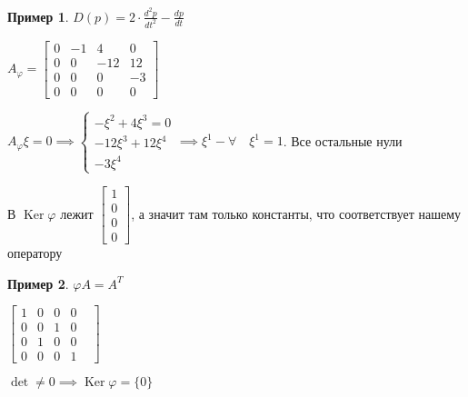 \documentclass{book}
\DeclareMathOperator{\Ker}{Ker}
\theoremstyle{definition}
\newtheorem*{example}{Пример}
\begin{document}
\begin{example}
    $D(p) = 2\cdot \frac{d^2p}{dt^2} - \frac{dp}{dt}$ 

    $A_{\varphi} = \begin{bmatrix} 0&-1&4&0\\0&0&-12&12\\0&0&0&-3\\0&0&0&0 \end{bmatrix} $

    $A_{\varphi}\xi = 0 \implies \begin{cases}
        -\xi^2 + 4\xi^3 = 0\\
        -12\xi^3 + 12\xi^4\\
        -3\xi^4
    \end{cases} \implies \xi^1 - \forall \quad \xi^1 = 1$. Все остальные нули

    В $\Ker\varphi$ лежит  $\begin{bmatrix} 1\\0\\0\\0 \end{bmatrix} $, а значит там только константы, что соответствует нашему оператору
\end{example}

\begin{example}
    $\varphi A = A^T$

    $\begin{bmatrix} 1&0&0&0\\0&0&1&0\\0&1&0&0&\\0&0&0&1 \end{bmatrix} $ 

    $\det \neq 0 \implies \Ker\varphi = \{0\}$
\end{example}
\end{document}
